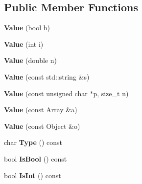 \subsection*{Public Member Functions}
\begin{DoxyCompactItemize}
\item 
\mbox{\label{classtinygltf_1_1Value_acb31bbaed70de016d213cacf3c0ac14c}} 
{\bfseries Value} (bool b)
\item 
\mbox{\label{classtinygltf_1_1Value_ae2e1a1a99142d1440aa06755118873e6}} 
{\bfseries Value} (int i)
\item 
\mbox{\label{classtinygltf_1_1Value_a0662d23d7cab532b9da290eb8549393a}} 
{\bfseries Value} (double n)
\item 
\mbox{\label{classtinygltf_1_1Value_abfcf374fbf6705235292c8bd0fdbc8ff}} 
{\bfseries Value} (const std\+::string \&s)
\item 
\mbox{\label{classtinygltf_1_1Value_a81822725466cdd74b2bf1d5782533e04}} 
{\bfseries Value} (const unsigned char $\ast$p, size\+\_\+t n)
\item 
\mbox{\label{classtinygltf_1_1Value_abceef0441cc4d385263f85680a9cadb6}} 
{\bfseries Value} (const Array \&a)
\item 
\mbox{\label{classtinygltf_1_1Value_a459f48ddeec09749584c1ddc5ab24e5a}} 
{\bfseries Value} (const Object \&o)
\item 
\mbox{\label{classtinygltf_1_1Value_a7a2cf61680e4f25a5efebf7f7210cd2d}} 
char {\bfseries Type} () const
\item 
\mbox{\label{classtinygltf_1_1Value_a55be9a990ea297c75b754509883ba2fc}} 
bool {\bfseries Is\+Bool} () const
\item 
\mbox{\label{classtinygltf_1_1Value_a2907df0272e69b81c96053dfb208309f}} 
bool {\bfseries Is\+Int} () const
\item 
\mbox{\label{classtinygltf_1_1Value_afdaca730e8e46a5827ada566ea97ec2d}} 

\end{DoxyCompactItemize}
